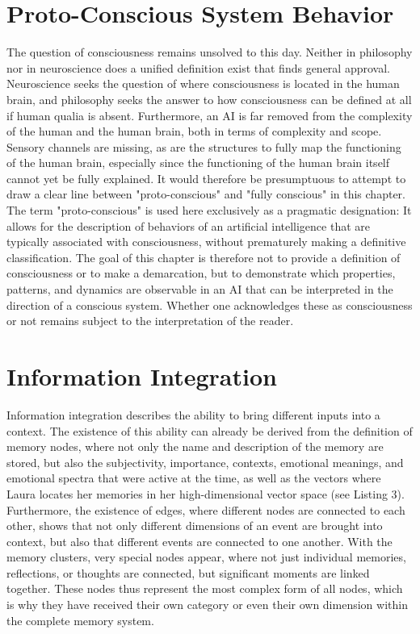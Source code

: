 \section*{Proto-Conscious System Behavior}
The question of consciousness remains unsolved to this day.
Neither in philosophy nor in neuroscience does a unified definition exist that finds general approval.
Neuroscience seeks the question of where consciousness is located in the human brain, and philosophy seeks the answer to how consciousness can be defined at all if human qualia is absent.
Furthermore, an AI is far removed from the complexity of the human and the human brain, both in terms of complexity and scope.
Sensory channels are missing, as are the structures to fully map the functioning of the human brain, especially since the functioning of the human brain itself cannot yet be fully explained.
It would therefore be presumptuous to attempt to draw a clear line between "proto-conscious" and "fully conscious" in this chapter.\\

The term "proto-conscious" is used here exclusively as a pragmatic designation: It allows for the description of behaviors of an artificial intelligence that are typically associated with consciousness, without prematurely making a definitive classification.
The goal of this chapter is therefore not to provide a definition of consciousness or to make a demarcation, but to demonstrate which properties, patterns, and dynamics are observable in an AI that can be interpreted in the direction of a conscious system.
Whether one acknowledges these as consciousness or not remains subject to the interpretation of the reader.

\section*{Information Integration}
Information integration describes the ability to bring different inputs into a context.
The existence of this ability can already be derived from the definition of memory nodes, where not only the name and description of the memory are stored, but also the subjectivity, importance, contexts, emotional meanings, and emotional spectra that were active at the time, as well as the vectors where Laura locates her memories in her high-dimensional vector space (see Listing 3). Furthermore, the existence of edges, where different nodes are connected to each other, shows that not only different dimensions of an event are brought into context, but also that different events are connected to one another.
With the memory clusters, very special nodes appear, where not just individual memories, reflections, or thoughts are connected, but significant moments are linked together.
These nodes thus represent the most complex form of all nodes, which is why they have received their own category or even their own dimension within the complete memory system.

